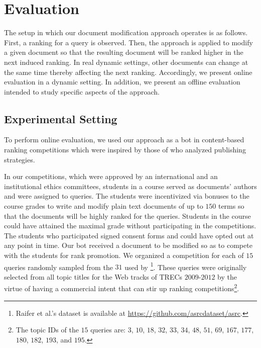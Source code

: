 \section{Evaluation}
\label{sec:eval}
The setup in which our document modification approach operates is as
follows.  First, a ranking for a query is observed. Then, the approach
is applied to modify a given document so that the resulting document
will be ranked higher in the next induced ranking. In real dynamic
settings, other documents can change at the same time thereby
affecting the next ranking. Accordingly, we present online evaluation in a dynamic setting. In
addition, we present an offline evaluation intended to study specific
aspects of the approach.


\subsection{Experimental Setting}
\label{sec:expSet}
To perform online evaluation, we used our approach as a bot in
content-based ranking competitions which were inspired by
those of \citet{Raifer+al:17a} who analyzed publishing strategies.

In our competitions, which were approved by an international and an
institutional ethics committees, students in a course served as
documents' authors and were assigned to queries.  The students were
incentivized via bonuses to the course grades to write and modify
plain text documents of up to $150$ terms so that the documents will
be highly ranked for the queries. Students in the course could have attained
the maximal grade without participating in the competitions. The
students who participated signed consent forms and could have opted
out at any point in time.  Our bot received a document to be modified
so as to compete with the students for rank promotion. We organized a
competition for each of $15$ queries randomly sampled from the $31$
used by \citet{Raifer+al:17a}\footnote{Raifer et al.'s dataset is
  available at \url{https://github.com/asrcdataset/asrc}.}.  These
queries were originally selected from all topic titles for the Web
tracks of TRECs $2009$-$2012$ by the virtue of having a commercial
intent that can stir up ranking competitions\footnote{The topic IDs of
  the $15$ queries are: $3$, $10$, $18$, $32$, $33$, $34$, $48$, $51$,
  $69$, $167$, $177$, $180$, $182$, $193$, and $195$.}.

